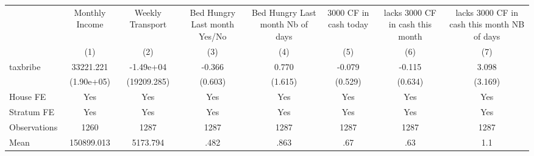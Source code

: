 {
\def\sym#1{\ifmmode^{#1}\else\(^{#1}\)\fi}
\begin{tabular}{l*{7}{c}}
\hline\hline
                &\multicolumn{1}{c}{Monthly Income}&\multicolumn{1}{c}{Weekly Transport}&\multicolumn{1}{c}{Bed Hungry Last month Yes/No}&\multicolumn{1}{c}{Bed Hungry Last month Nb of days}&\multicolumn{1}{c}{3000 CF in cash today}&\multicolumn{1}{c}{lacks 3000 CF in cash this month}&\multicolumn{1}{c}{lacks 3000 CF in cash this month NB of days}\\
                &\multicolumn{1}{c}{(1)}         &\multicolumn{1}{c}{(2)}         &\multicolumn{1}{c}{(3)}         &\multicolumn{1}{c}{(4)}         &\multicolumn{1}{c}{(5)}         &\multicolumn{1}{c}{(6)}         &\multicolumn{1}{c}{(7)}         \\
\hline
taxbribe        &33221.221         &-1.49e+04         &   -0.366         &    0.770         &   -0.079         &   -0.115         &    3.098         \\
                &(1.90e+05)         &(19209.285)         &  (0.603)         &  (1.615)         &  (0.529)         &  (0.634)         &  (3.169)         \\
House FE        &      Yes         &      Yes         &      Yes         &      Yes         &      Yes         &      Yes         &      Yes         \\
Stratum FE      &      Yes         &      Yes         &      Yes         &      Yes         &      Yes         &      Yes         &      Yes         \\
\hline
Observations    &     1260         &     1287         &     1287         &     1287         &     1287         &     1287         &     1287         \\
Mean            &150899.013         & 5173.794         &     .482         &     .863         &      .67         &      .63         &      1.1         \\
\hline\hline
\end{tabular}
}
